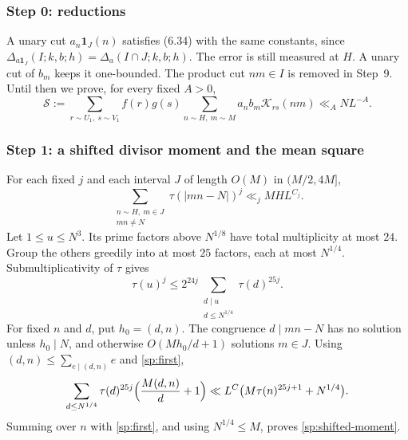 \subsubsection*{Step 0: reductions}
A unary cut $a_n\mathbf1_J(n)$ satisfies (6.34) with the same constants,
since $\Delta_{a\mathbf1_J}(I;k,b;h)=\Delta_a(I\cap J;k,b;h)$. The error is
still measured at $H$. A unary cut of $b_m$ keeps it one-bounded. The
product cut $nm\in I$ is removed in Step~9. Until then we prove, for every
fixed $A>0$,
\begin{equation}\label{sp:l52-L}
 \mathcal S:=\sum_{r\sim U_1,\ s\sim V_1}f(r)g(s)
 \sum_{n\sim H,\ m\sim M}a_nb_m\mathcal K_{rs}(nm)\ll_ANL^{-A}.
\end{equation}

\subsubsection*{Step 1: a shifted divisor moment and the mean square}
For each fixed $j$ and each interval $J$ of length $O(M)$ in $(M/2,4M]$,
\begin{equation}\label{sp:shifted-moment}
 \sum_{\substack{n\sim H,\ m\in J\\mn\ne N}}\tau(|mn-N|)^j\ll_jMHL^{C_j}.
\end{equation}
Let $1\le u\le N^3$. Its prime factors above $N^{1/8}$ have total
multiplicity at most $24$. Group the others greedily into at most $25$
factors, each at most $N^{1/4}$. Submultiplicativity of $\tau$ gives
\[
 \tau(u)^j\le2^{24j}\sum_{\substack{d\mid u\\d\le N^{1/4}}}\tau(d)^{25j}.
\]
For fixed $n$ and $d$, put $h_0=(d,n)$. The congruence $d\mid mn-N$ has no
solution unless $h_0\mid N$, and otherwise $O(Mh_0/d+1)$ solutions $m\in J$.
Using $(d,n)\le\sum_{e\mid(d,n)}e$ and \eqref{sp:first},
\[
 \sum_{d\le N^{1/4}}\tau(d)^{25j}\Bigl(\frac{M(d,n)}d+1\Bigr)
 \ll L^{C}\bigl(M\tau(n)^{25j+1}+N^{1/4}\bigr).
\]
Summing over $n$ with \eqref{sp:first}, and using $N^{1/4}\le M$, proves
\eqref{sp:shifted-moment}.

